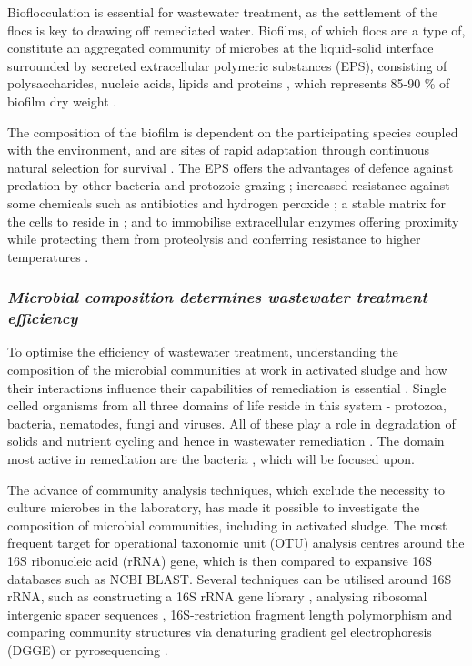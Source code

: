 \documentclass{article}
\begin{document}
Bioflocculation is essential for wastewater treatment, as the settlement of the flocs is key to drawing off remediated water. Biofilms, of which flocs are a type of, constitute an aggregated community of microbes at the liquid-solid interface surrounded by secreted extracellular polymeric substances (EPS), consisting of polysaccharides, nucleic acids, lipids and proteins \cite{wingender1999}, which represents 85-90 \% of biofilm dry weight \cite{Frolund_96}. 


The composition of the biofilm is dependent on the participating species coupled with the environment, and are sites of rapid adaptation through continuous natural selection for survival \cite{boles2008,matz2005,palmer2001}.  
The EPS offers the advantages of defence against predation by other bacteria \cite{rao2005} and protozoic grazing \cite{matz2005}; increased resistance against some chemicals such as antibiotics and hydrogen peroxide \cite{burmolle_06}; a stable matrix for the cells to reside in \cite{Flemming_10}; and to immobilise extracellular enzymes offering proximity while protecting them from proteolysis and conferring resistance to higher temperatures \cite{wingender2002extracellular,Flemming_10,skillman1998}.

\subsubsection{\emph{Microbial composition determines wastewater treatment efficiency}}
To optimise the efficiency of wastewater treatment, understanding the composition of the microbial communities at work in activated sludge and how their interactions influence their capabilities of remediation is essential \cite{daims2006}.
Single celled organisms from all three domains of life reside in this system - protozoa, bacteria, nematodes, fungi and viruses. All of these play a role in degradation of solids and nutrient cycling and hence in wastewater remediation \cite{muchie2010bioremediation}. The domain most active in remediation are the bacteria \cite{spellman2008handbook}, which will be focused upon.


The advance of community analysis techniques, which exclude the necessity to culture microbes in the laboratory, has made it possible to investigate the composition of microbial communities, including in activated sludge. The most frequent target for operational taxonomic unit (OTU) analysis centres around the 16S ribonucleic acid (rRNA) gene, which is then compared to expansive 16S databases such as NCBI BLAST. Several techniques can be utilised around 16S rRNA, such as constructing a 16S rRNA gene library \cite{McGarvey_04}, analysing ribosomal intergenic spacer sequences \cite{Yu_01}, 16S-restriction fragment length polymorphism \cite{Gilbride_06} and comparing community structures via denaturing gradient gel electrophoresis (DGGE) \cite{Hesham_11} or pyrosequencing \cite{wang2012pyrosequencing}.
\end{document}
